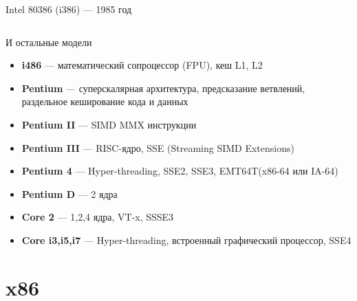 \documentclass{beamer}
\begin{document}
\begin{frame}{Intel 80386 (i386) --- 1985 год}
\begin{columns}
    \end{columns}
    \end{frame}
    \begin{frame}{И остальные модели}
    	\begin{itemize}
    		\item {\bf i486} --- математический сопроцессор (FPU), кеш L1, L2
    		\item {\bf Pentium} --- суперскалярная архитектура, предсказание ветвлений, раздельное кеширование кода и данных
    		\item {\bf Pentium II} --- SIMD MMX инструкции
    		\item {\bf Pentium III} --- RISC-ядро, SSE (Streaming SIMD Extensions)
    		\item {\bf Pentium 4} --- Hyper-threading, SSE2, SSE3, EMT64T(x86-64 или IA-64)
    		\item {\bf Pentium D} --- 2 ядра
    		\item {\bf Core 2} --- 1,2,4 ядра, VT-x, SSSE3
    		\item {\bf Core i3,i5,i7} --- Hyper-threading, встроенный графический процессор, SSE4

    	\end{itemize}
    \end{frame}
    \section{x86}
\end{document}
